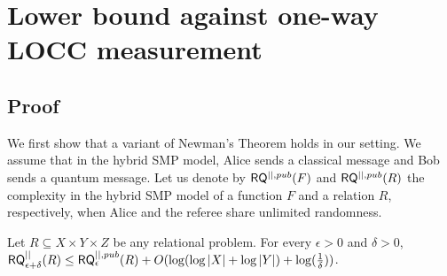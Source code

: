 \section{Lower bound against one-way LOCC measurement}\label{sec:one-way_locc}

\subsection{Proof}\label{subsec:proof_1waylocc}

We first show that a variant of Newman's Theorem holds in our setting. We assume that in the hybrid SMP model, Alice sends a classical message and Bob sends a quantum message.
Let us denote by $\mathsf{R}\mathsf{Q}^{||,pub}(F)$ and $\mathsf{R}\mathsf{Q}^{||,pub}(R)$ the complexity in the hybrid SMP model of a function $F$ and a relation $R$, respectively, when Alice and the referee share unlimited randomness.

\begin{lemma}\label{lem:newman}
    Let $R \subseteq X \times Y \times Z$ be any relational problem. For every $\epsilon>0$ and $\delta>0$, $\mathsf{R}\mathsf{Q}_{\epsilon+\delta}^{||}(R) \leq \mathsf{R}\mathsf{Q}_\epsilon^{||,pub} (R) + O(\log (\log |X| + \log |Y|) + \log (\frac{1}{\delta}))$.
\end{lemma}

